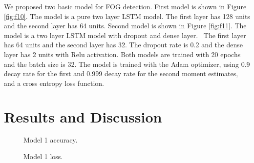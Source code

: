 \documentclass[10pt,twocolumn,letterpaper]{article}
\begin{document}
    We proposed two basic model for FOG detection. First model is shown in Figure \ref{fig:f10}. The model is a pure two layer LSTM model. The first layer has 128 units and the second layer has 64 units. Second model is shown in Figure \ref{fig:f11}. The model is a two layer LSTM model with dropout and dense layer.~\cite{10.1162/neco.1997.9.8.1735} The first layer has 64 units and the second layer has 32. The dropout rate is 0.2 and the dense layer has 2 units with Relu activation. Both models are trained with 20 epochs and the batch size is 32. The model is trained with the Adam optimizer, using 0.9 decay rate for the first and 0.999 decay rate for the second moment estimates, and a cross entropy loss function.

\section{Results and Discussion}
\label{sec:result}

\begin{figure}[t]
    \centering
    \caption{Model 1 accuracy.}
    \label{fig:f12}
\end{figure}

\begin{figure}[t]
    \centering
    \caption{Model 1 loss.}
    \label{fig:f13}
\end{figure}
\end{document}
